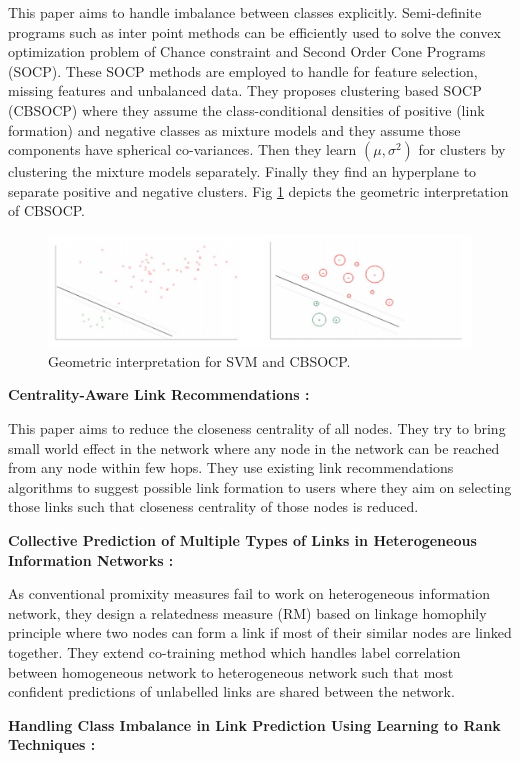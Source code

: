 \indent This paper aims to handle imbalance between classes explicitly. Semi-definite programs such as inter point methods can be efficiently used to solve the convex optimization problem of Chance constraint and Second Order Cone Programs (SOCP). These SOCP methods are employed to handle for feature selection, missing features and unbalanced data. They proposes clustering based SOCP (CBSOCP) where they assume the class-conditional densities  of positive (link formation) and negative classes as mixture models and they assume those components have spherical co-variances. Then they learn $(\mu, \sigma^2)$ for clusters by clustering the mixture models separately. Finally they find an hyperplane to separate positive and negative clusters. Fig \ref{fig:socp} depicts the geometric interpretation of CBSOCP. \\
\begin{figure}[!ht]
	\centering
	\captionsetup{justification=centering}	
	\includegraphics[scale=0.5]{snaps/socp.jpg}	
	\caption{Geometric interpretation for SVM and CBSOCP.\cite{socp}}
	\label{fig:socp}
\end{figure}
\begin{flushleft}
\textbf{Centrality-Aware Link Recommendations \cite{centrality} :}
\end{flushleft}

\indent This paper aims to reduce the closeness centrality of all nodes. They try to bring small world effect in the network where any node in the network can be reached from any node within few hops. They use existing link recommendations algorithms to suggest possible link formation to users where they aim on selecting those links such that closeness centrality of those nodes is reduced.
\begin{flushleft}
\textbf{Collective Prediction of Multiple Types of Links in Heterogeneous Information Networks \cite{collectiveprediction} :}
\end{flushleft}

\indent As conventional promixity measures fail to work on heterogeneous information network, they design a relatedness measure (RM) based on linkage homophily principle where two nodes can form a link if most of their similar nodes are linked together. They extend co-training method which handles label correlation between homogeneous network to heterogeneous network such that most confident predictions of unlabelled links are shared between the network.
\begin{flushleft}
\textbf{Handling Class Imbalance in Link Prediction Using Learning to Rank Techniques \cite{handlingclassimbalance} :}
\end{flushleft}

